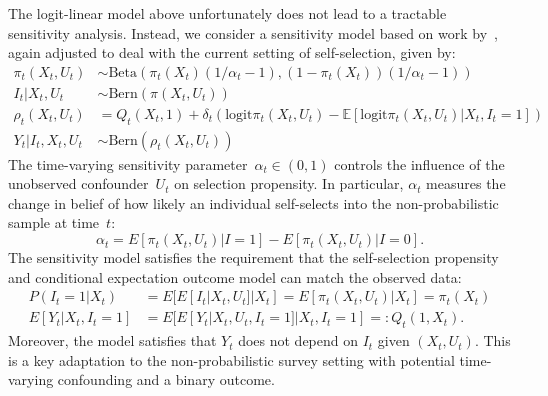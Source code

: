 \documentclass[12pt]{amsart}
\numberwithin{equation}{section}
\theoremstyle{plain}
\def\logit{\text{logit}}
\def\EE{\mathbb{E}}
\begin{document}
The logit-linear model above unfortunately does not lead to a tractable sensitivity analysis.  Instead, we consider a sensitivity model based on work by~\cite{Veitch2020}, again adjusted to deal with the current setting of self-selection, given by:
\begin{equation}
\begin{aligned}
\label{eq:sensmodel}
\pi_t(X_t, U_t) &\sim \text{Beta} \left( \pi_t (X_t) (1/\alpha_t - 1), (1-\pi_t(X_t)) (1/\alpha_t - 1) \right) \\
I_t | X_t, U_t &\sim \text{Bern} (\pi (X_t,U_t)) \\
\rho_t(X_t, U_t) &= Q_t(X_t,1) + \delta_t \left( \logit \pi_t(X_t,U_t) - \EE \left[ \logit \pi_t(X_t,U_t) | X_t, I_t = 1 \right] \right) \\
Y_t | I_t, X_t, U_t &\sim \text{Bern}(\rho_t(X_t, U_t))
\end{aligned}
\end{equation}
The time-varying sensitivity parameter~$\alpha_t \in (0,1)$  controls the influence of the unobserved confounder~$U_t$ on selection propensity. In particular, $\alpha_t$ measures the change in belief of how likely an individual self-selects into the non-probabilistic sample at time~$t$:
$$
\alpha_t = E[ \pi_t (X_t,U_t) | I = 1] - E[ \pi_t (X_t,U_t) | I = 0].
$$
The sensitivity model satisfies the requirement that the self-selection propensity and conditional expectation outcome model can match the observed data:
\begin{align*}
P(I_t = 1 | X_t ) &= E[ E[ I_t | X_t, U_t ] | X_t ] = E[ \pi_t(X_t, U_t) | X_t ] = \pi_t (X_t) \\
E[Y_t | X_t, I_t = 1 ] &= E[ E[ Y_t | X_t, U_t, I_t =1 ] | X_t, I_t = 1 ] =: Q_t(1,X_t).
\end{align*}
Moreover, the model satisfies that $Y_t$ does not depend on $I_t$ given $(X_t, U_t)$. This is a key adaptation to the non-probabilistic survey setting with potential time-varying confounding and a binary outcome.
\end{document}
